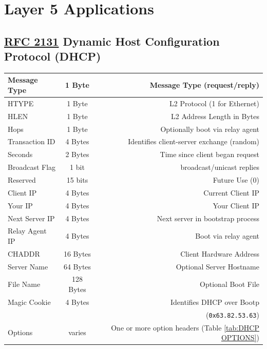 \documentclass[12pt]{article}
\newcommand{\RFC}[1]{\href{https://datatracker.ietf.org/doc/html/rfc#1}{RFC #1}}
\begin{document}
\section{Layer 5 Applications \label{sec:L5}}

	\subsection{\RFC{2131} Dynamic Host Configuration Protocol (DHCP) \label{subsec:DHCP}}
	\begin{table}[H]
	\centering
	\begin{tabular}{| l | c | r |}
	\hline
	Message Type		& 1 Byte	& Message Type (request/reply)\\\hline
	HTYPE			& 1 Byte	& L2 Protocol (1 for Ethernet)\\\hline
	HLEN				& 1 Byte	& L2 Address Length in Bytes\\\hline
	Hops				& 1 Byte	& Optionally boot via relay agent\\\hline
	Transaction ID		& 4 Bytes	& Identifies client-server exchange (random)\\\hline
	Seconds			& 2 Bytes	& Time since client began request\\\hline
	Broadcast Flag		& 1 bit 	& broadcast/unicast replies\\\hline
	Reserved			& 15 bits	& Future Use (0)\\\hline
	Client IP			& 4 Bytes	& Current Client IP\\\hline
	Your IP			& 4 Bytes	& Your Client IP\\\hline
	Next Server IP		& 4 Bytes	& Next server in bootstrap process\\\hline
	Relay Agent IP		& 4 Bytes	& Boot via relay agent\\\hline
	CHADDR			& 16 Bytes	& Client Hardware Address\\\hline
	Server Name		& 64 Bytes	& Optional Server Hostname\\\hline
	File Name			& 128 Bytes	& Optional Boot File\\\hline
	Magic Cookie		& 4 Bytes	& Identifies DHCP over Bootp\\
					&		& (\texttt{0x63.82.53.63})\\\hline
	Options			& varies	& One or more option headers (Table \ref{tab:DHCP OPTIONS})\\\hline
	\end{tabular}\end{table}
\end{document}
